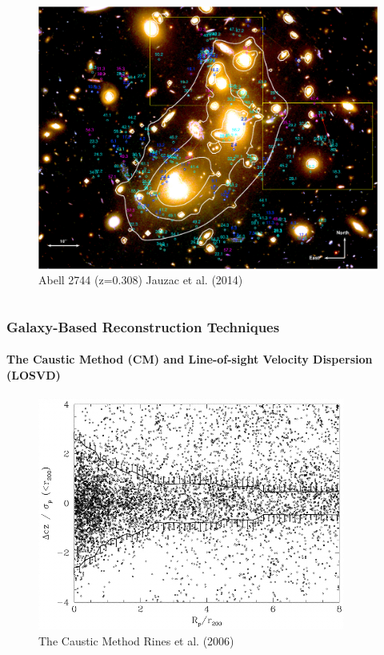 \documentclass[hyperref={pdfpagelabels=false}]{beamer}
\begin{document}
\begin{frame}
\begin{columns}
\begin{column}{0.55\textwidth}
\begin{block}{}
\begin{figure}
          \includegraphics[width=\textwidth]{jauzac.pdf}
          \caption{Abell 2744 (z=0.308) {\tiny Jauzac et al. (2014)}}
        \end{figure}
      \end{block}
    \end{column}
  \end{columns}
\end{frame}

\begin{frame}
\frametitle{Galaxy-Based Reconstruction Techniques}
\framesubtitle{The Caustic Method (CM) and Line-of-sight Velocity Dispersion
  (LOSVD)}
      \begin{figure}
        \includegraphics[width=0.9\textwidth]{rines.png}
        \caption{The Caustic Method {\tiny Rines et al. (2006)}}
      \end{figure}
\end{frame}
\end{document}
